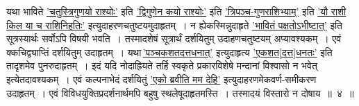 \documentclass[11pt, openany]{book}
\begin{document}
\begin{sloppypar}
यथा भाविते \hyperref[11.182]{'चतुस्त्रिगुणयो राश्योः'} इति \hyperref[11.186]{'द्विगुणेन कयो राश्योः'} इति \hyperref[11.187]{'त्रिपञ्च-गुणराशिभ्याम्'} इति \hyperref[11.184]{'यौ राशी किल या च राशिनिहतिः'} इत्युदाहरणचतुष्टयमुदाहृतम्~। न ह्येकस्मिन्नुदाहृते \hyperref[11.185]{'भावितं पक्षतोऽभीष्टात्'} इति सूत्रस्यार्थः सर्वोऽपि विषयी भवति~। तस्मादशेषं सूत्रार्थं दर्शयितुम् उदाहणचतुष्टयम् अप्यावश्यकम्~। एवं क्कचिद्व्याप्तिं दर्शयितुम् उदाहृतम्~। यथा\textendash \,\hyperref[7.96]{'पञ्चकशतदत्तधनात्'} इत्युदाहृत्य \hyperref[7.97]{'एकशत[दत्त]धनतः'} इति तादृशमेव पुनरुदाहृतम्~। इदं यदि नोदाह्रियते तर्हि स्वकृते प्रकारविशेषे मन्दानां विश्वासो न भवेत् इत्येतदावश्यकम्~। एवं कल्पनाभेदं दर्शयितुं \hyperref[9.136]{'एको ब्रवीति मम देहि'} इत्युदाहरणमेकवर्ण-समीकरण उदाहृतम्~। एवं विविधयुक्तिप्रदर्शनार्थमपि बहुषु स्थलेषूदाहृतमस्ति~। तस्मादयं विस्तारो न दोषाय~॥~४~॥
\end{sloppypar}

\newpage
\end{document}
